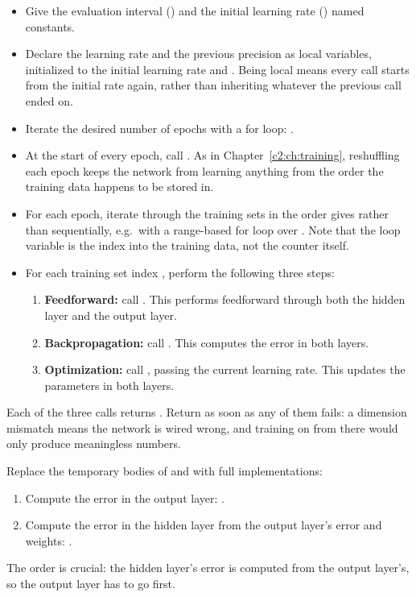 \begin{itemize}
  \item Give the evaluation interval () and the initial learning rate () named
    constants.
  \item Declare the learning rate and the previous precision as local variables, initialized to the
    initial learning rate and . Being local means every call starts from the initial rate
    again, rather than inheriting whatever the previous call ended on.
  \item Iterate the desired number of epochs with a for loop:
    .
  \item At the start of every epoch, call . As in
    Chapter~\ref{c2:ch:training}, reshuffling each epoch keeps the network from learning anything
    from the order the training data happens to be stored in.
  \item For each epoch, iterate through the training sets in the order  gives
    rather than sequentially, e.g.\ with a range-based for loop over . Note that
    the loop variable is the index into the training data, not the counter itself.
  \item For each training set index , perform the following three steps:
  \begin{enumerate}
    \item \textbf{Feedforward:} call . This performs feedforward
      through both the hidden layer and the output layer.
    \item \textbf{Backpropagation:} call . This computes the
      error in both layers.
    \item \textbf{Optimization:} call , passing the
      current learning rate. This updates the parameters in both layers.
  \end{enumerate}
\end{itemize}
Each of the three calls returns . Return  as soon as any of them fails: a
dimension mismatch means the network is wired wrong, and training on from there would only produce
meaningless numbers.

Replace the temporary bodies of  and  with full
implementations:

\begin{enumerate}
  \item Compute the error in the output layer: .
  \item Compute the error in the hidden layer from the output layer's error and weights:\newline
    .
\end{enumerate}
The order is crucial: the hidden layer's error is computed from the output layer's, so the output
layer has to go first.

